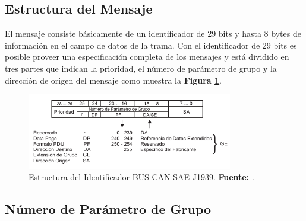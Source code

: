 \subsection{Estructura del Mensaje}
El mensaje consiste básicamente de un identificador de 29 bits y hasta 8 bytes de información en el campo de datos de la trama. Con el identificador de 29 bits es posible proveer una especificación completa de los mensajes y está dividido en tres partes que indican la prioridad, el número de parámetro de grupo y la dirección de origen del mensaje como muestra la \textbf{Figura \ref{bitj}}.


\begin{figure}[H]
	\centering
		\includegraphics[width=0.8\textwidth]{./Cap3imagen/bit29.pdf}
	\caption[Estructura del Identificador BUS CAN SAE J1939.]{Estructura del Identificador BUS CAN SAE J1939.\textbf{ Fuente:} \cite{EPCAN}.}
	\label{bitj} %
\end{figure}




\subsection{Número de Parámetro de Grupo}


